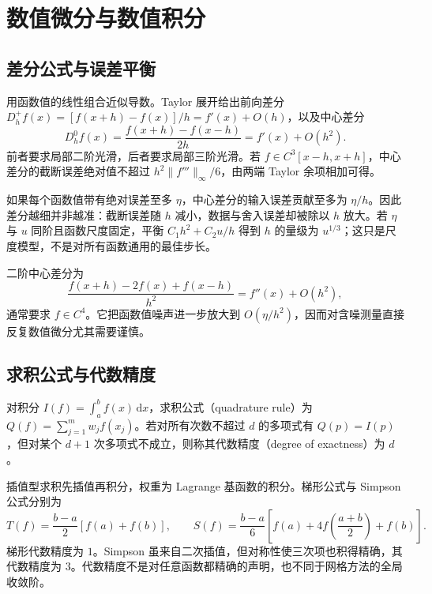 \documentclass[UTF8,12pt,a4paper,fontset=fandol]{ctexbook}
\begin{document}
\chapter{数值微分与数值积分}
\label{chap:na-quadrature}

\section{差分公式与误差平衡}
用函数值的线性组合近似导数。Taylor 展开给出前向差分 $D_h^+f(x)=[f(x+h)-f(x)]/h=f'(x)+O(h)$，以及中心差分
\begin{equation}
 D_h^0f(x)=\frac{f(x+h)-f(x-h)}{2h}=f'(x)+O(h^2).
 \label{eq:na-central-difference}
\end{equation}
前者要求局部二阶光滑，后者要求局部三阶光滑。若 $f\in C^3[x-h,x+h]$，中心差分的截断误差绝对值不超过 $h^2\|f'''\|_\infty/6$，由两端 Taylor 余项相加可得。

如果每个函数值带有绝对误差至多 $\eta$，中心差分的输入误差贡献至多为 $\eta/h$。因此差分越细并非越准：截断误差随 $h$ 减小，数据与舍入误差却被除以 $h$ 放大。若 $\eta$ 与 $u$ 同阶且函数尺度固定，平衡 $C_1h^2+C_2u/h$ 得到 $h$ 的量级为 $u^{1/3}$；这只是尺度模型，不是对所有函数通用的最佳步长。

二阶中心差分为
\[
 \frac{f(x+h)-2f(x)+f(x-h)}{h^2}=f''(x)+O(h^2),
\]
通常要求 $f\in C^4$。它把函数值噪声进一步放大到 $O(\eta/h^2)$，因而对含噪测量直接反复数值微分尤其需要谨慎。

\section{求积公式与代数精度}
\begin{definition}[求积公式的代数精度]
对积分 $I(f)=\int_a^bf(x)\,\mathrm dx$，求积公式（quadrature rule）为 $Q(f)=\sum_{j=1}^m w_jf(x_j)$。若对所有次数不超过 $d$ 的多项式有 $Q(p)=I(p)$，但对某个 $d+1$ 次多项式不成立，则称其代数精度（degree of exactness）为 $d$。
\end{definition}
插值型求积先插值再积分，权重为 Lagrange 基函数的积分。梯形公式与 Simpson 公式分别为
\[
 T(f)=\frac{b-a}{2}[f(a)+f(b)],\qquad
 S(f)=\frac{b-a}{6}\left[f(a)+4f\left(\frac{a+b}{2}\right)+f(b)\right].
\]
梯形代数精度为 $1$。Simpson 虽来自二次插值，但对称性使三次项也积得精确，其代数精度为 $3$。代数精度不是对任意函数都精确的声明，也不同于网格方法的全局收敛阶。
\end{document}
